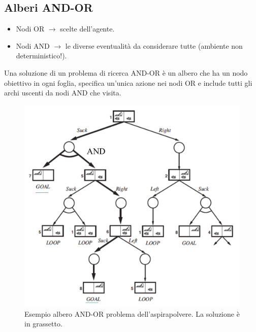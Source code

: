 \documentclass{article}
\begin{document}
\subsection{Alberi AND-OR}
\begin{itemize}
    \item Nodi OR $\rightarrow$ scelte dell'agente.
    \item Nodi AND $\rightarrow$ le diverse eventualità da considerare tutte (ambiente non deterministico!).
\end{itemize}
Una soluzione di un problema di ricerca AND-OR è un albero che ha un nodo obiettivo in ogni foglia, specifica un'unica azione nei nodi OR e include tutti gli archi uscenti da nodi AND che visita.
\clearpage
\begin{figure}[H]
    \centering
    \includegraphics[scale=0.5]{Images/andortree.png}
    \caption{Esempio albero AND-OR problema dell'aspirapolvere. La soluzione è in grassetto.}
\end{figure}
\end{document}
